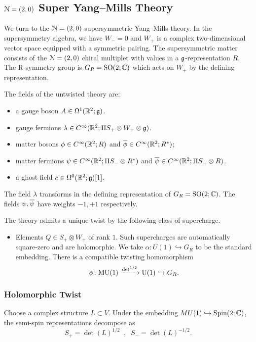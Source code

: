 \documentclass[10pt, oneside]{article}
\begin{document}
\subsection{\texorpdfstring{$\cN=(2,0)$}{N=(2,0)} Super Yang--Mills Theory} \label{sect:2d(2,0)}

We turn to the $\cN=(2,0)$ supersymmetric Yang--Mills theory.
In the supersymmetry algebra, we have $W_-=0$ and $W_+$ is a complex two-dimensional vector space equipped with a symmetric pairing. 
The supersymmetric matter consists of the $\cN = (2,0)$ chiral multiplet with values in a $\fg$-representation $R$. 
The R-symmetry group is $G_R = \SO(2;\CC)$ which acts on $W_+$ by the defining representation. 

The fields of the untwisted theory are:
\begin{itemize}
\item a gauge boson $A \in \Omega^1(\RR^2;\fg)$.
\item gauge fermions $\lambda \in C^\infty(\RR^2 ; \Pi S_+ \otimes W_+ \otimes \fg)$. 
\item matter bosons $\phi \in C^\infty(\RR^2 ; R)$ and $\Bar{\phi} \in C^\infty(\RR^2 ; R^*)$;
\item matter fermions $\psi \in C^\infty(\RR^2 ; \Pi S_- \otimes R^*)$  and $\Bar{\psi} \in C^\infty(\RR^2 ; \Pi S_- \otimes R)$.
\item a ghost field $c \in \Omega^0(\RR^2 ; \fg)[1]$.
\end{itemize}
The field $\lambda$ transforms in the defining representation of $G_R = \SO(2;\CC)$.
The fields $\psi, \Bar{\psi}$ have weights $-1,+1$ respectively.

The theory admits a unique twist by the following class of supercharge.
\begin{itemize}
\item Elements $Q \in S_+ \otimes W_+$ of rank $1$. 
Such supercharges are automatically square-zero and are holomorphic.
We take $\alpha \colon U(1) \hookrightarrow G_R$ to be the standard embedding.
There is a compatible twisting homomorphism
\[
\phi \colon \MU(1) \xto{\det^{1/2}} \U(1) \hookrightarrow G_R .
\]
\end{itemize}

\subsubsection{Holomorphic Twist} \label{sect:2d20minimaltwist}

Choose a complex structure $L \subset V$. 
Under the embedding $MU(1) \hookrightarrow \Spin(2; \CC)$, the semi-spin representations decompose as
\[
S_+ = \det(L)^{1/2} \;\; , \;\; S_- = \det(L)^{-1/2} .
\]
\end{document}

